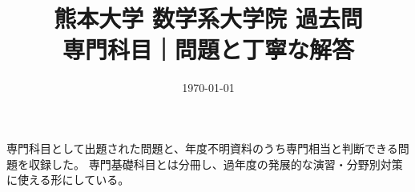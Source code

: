 \documentclass[uplatex, dvipdfmx]{jsreport}
\title{熊本大学 数学系大学院 過去問\\{\Large 専門科目｜問題と丁寧な解答}}
\author{}
\date{\today}
\begin{document}
\maketitle

\begin{memo*}
専門科目として出題された問題と、年度不明資料のうち専門相当と判断できる問題を収録した。
専門基礎科目とは分冊し、過年度の発展的な演習・分野別対策に使える形にしている。
\end{memo*}

\tableofcontents







\end{document}
